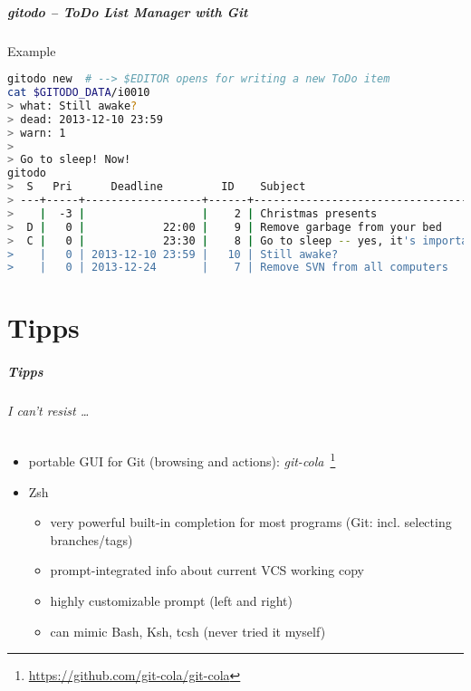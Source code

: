 \documentclass[english,hyperref={pdfpagelabels=false},aspectratio=169]{beamer}
\begin{document}
\begin{frame}[fragile]
  \frametitle{gitodo -- ToDo List Manager with Git}
  \begin{block}{Example}
    \vspace{-0.75em}
    \begin{lstlisting}[language=zsh]
gitodo new  # --> $EDITOR opens for writing a new ToDo item
cat $GITODO_DATA/i0010
> what: Still awake?
> dead: 2013-12-10 23:59
> warn: 1
>
> Go to sleep! Now!
gitodo
>  S   Pri      Deadline         ID    Subject
> ---+-----+------------------+------+-----------------------------------
>    |  -3 |                  |    2 | Christmas presents
>  D |   0 |            22:00 |    9 | Remove garbage from your bed
>  C |   0 |            23:30 |    8 | Go to sleep -- yes, it's important
>    |   0 | 2013-12-10 23:59 |   10 | Still awake?
>    |   0 | 2013-12-24       |    7 | Remove SVN from all computers
    \end{lstlisting}
    \vspace{-0.75em}
  \end{block}
\end{frame}


\part{Tipps}
\makepart

\begin{frame}[label=tipps]
  \frametitle{Tipps}
  \framesubtitle{I can't resist \dots}
  \begin{itemize}
    \item portable GUI for Git {\scriptsize\color{fzjgray50}(browsing and actions)}: \textit{git-cola}~\footnote{\tiny\url{https://github.com/git-cola/git-cola}}
    \item Zsh
      \begin{itemize}
        \item very powerful built-in completion for most programs {\scriptsize\color{fzjgray50}(Git: incl. selecting branches/tags)}
        \item prompt-integrated info about current VCS working copy
        \item highly customizable prompt {\scriptsize\color{fzjgray50}(left and right)}
        \item can mimic Bash, Ksh, tcsh {\scriptsize\color{fzjgray50}(never tried it myself)}
      \end{itemize}
  \end{itemize}
\end{frame}
\end{document}
